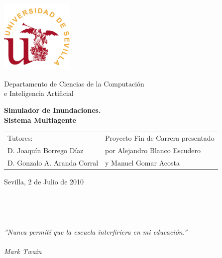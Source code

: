 \thispagestyle{empty}

{
\thispagestyle{empty}
\begin{center}
\includegraphics[width=35mm]{figuras/titulo/logous.png}
\end{center}
\vspace*{0cm}
\Large
\begin{center}
{\normalsize \sc
Departamento de Ciencias de la Computación \\ e Inteligencia Artificial \\}

\end{center}

\vspace{0.5cm}

\LARGE

\begin{center}
{\bf Simulador de Inundaciones. \\ Sistema Multiagente}
\end{center}

\normalsize

\vspace{75mm}

\begin{tabular}{ll}
  Tutores: \hspace{5cm} & Proyecto Fin de Carrera presentado\\
  D. Joaquín Borrego Díaz & por Alejandro Blanco Escudero\\
  D. Gonzalo A. Aranda Corral & y Manuel Gomar Acosta \\
\end{tabular}

\vspace{1cm}

\hspace{1mm} Sevilla, 2 de Julio de 2010

\newpage
\thispagestyle{empty}
\mbox{ }
\newpage
\thispagestyle{empty}

\newpage
\thispagestyle{empty}

\mbox{ }

\vfill

\begin{flushright}
\begin{minipage}{9cm}
\em{''Nunca permití que la escuela interfiriera en mi educación.''}\\ \\
Mark Twain
\end{minipage}
\end{flushright}

\vfill

\newpage
\thispagestyle{empty}
\mbox{ }

}